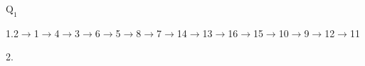 \documentclass[12pt]{article}
\begin{document}
$\text{Q}_{1}$

1.{\small\textcircled{\scriptsize{2}}}$\rightarrow${\small\textcircled{\scriptsize{1}}}$\rightarrow${\small\textcircled{\scriptsize{4}}}$\rightarrow${\small\textcircled{\scriptsize{3}}}$\rightarrow${\small\textcircled{\scriptsize{6}}}$\rightarrow${\small\textcircled{\scriptsize{5}}}$\rightarrow${\small\textcircled{\scriptsize{8}}}$\rightarrow${\small\textcircled{\scriptsize{7}}}$\rightarrow${\small\textcircled{\scriptsize{14}}}$\rightarrow${\small\textcircled{\scriptsize{13}}}$\rightarrow${\small\textcircled{\scriptsize{16}}}$\rightarrow${\small\textcircled{\scriptsize{15}}}$\rightarrow${\small\textcircled{\scriptsize{10}}}$\rightarrow${\small\textcircled{\scriptsize{9}}}$\rightarrow${\small\textcircled{\scriptsize{12}}}$\rightarrow${\small\textcircled{\scriptsize{11}}}

2.
\end{document}
